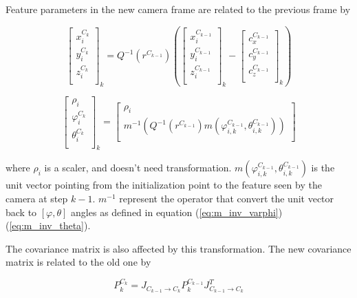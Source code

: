 Feature parameters in the new camera frame are related to the previous frame 
by

\begin{equation}
\begin{bmatrix}
x_{i}^{C_{k}} \\
y_{i}^{C_{k}} \\
z_{i}^{C_{k}} \\
\end{bmatrix}_{k}=Q^{-1}(r^{C_{k-1}})\left(
\begin{bmatrix}
x_{i}^{C_{k-1}} \\
y_{i}^{C_{k-1}} \\
z_{i}^{C_{k-1}} \\
\end{bmatrix}_{k}- \begin{bmatrix}
c_{x}^{C_{k-1}} \\
c_{y}^{C_{k-1}} \\
c_{z}^{C_{k-1}} \\
\end{bmatrix}_{k}\right)
\end{equation}

\begin{equation}
\begin{bmatrix}
\rho_{i} \\
\varphi_{i}^{C_{k}} \\
\theta_{i}^{C_{k}} \\
\end{bmatrix}_{k}=
\begin{bmatrix}
\rho _{i} \\
m^{-1}\left(Q^{-1}(r^{C_{k-1}})m(\varphi _{i, k}^{C_{k-1}}, \theta _{i, k}^{C_{k-1}})\right) \\
\end{bmatrix}
\end{equation}

\noindent where $\rho_i$ is a scaler, and doesn't need transformation.
$m(\varphi_{i, k}^{C_{k-1}}, \theta_{i, k}^{C_{k-1}})$ is the unit
vector pointing from the initialization point to the feature seen by
the camera at step $k-1$. $m^{-1}$ represent the operator that convert
the unit vector back to $[\varphi, \theta]$ angles as defined in
equation (\ref{eq:m_inv_varphi}) (\ref{eq:m_inv_theta}).

The covariance matrix is also affected by this transformation. The new
covariance matrix is related to the old one by

\begin{equation}
P_{k}^{C_{k}}=J_{C_{k-1}\to C_{k}}P_{k}^{C_{k-1}}J_{C_{k-1}\to C_{k}}^{T}
\end{equation}

